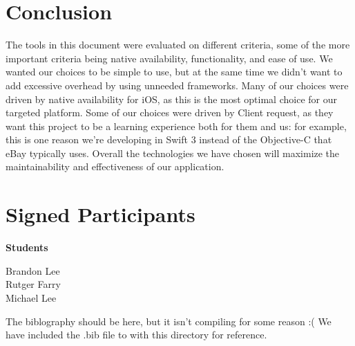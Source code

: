\documentclass[letterpaper,10pt,titlepage]{article}
\begin{document}
\section{Conclusion}
The tools in this document were evaluated on different criteria, some of the more important criteria being native availability, functionality, and ease of use. We wanted our choices to be simple to use, but at the same time we didn't want to add excessive overhead by using unneeded frameworks. Many of our choices were driven by native availability for iOS, as this is the most optimal choice for our targeted platform. Some of our choices were driven by Client request, as they want this project to be a learning experience both for them and us: for example, this is one reason we're developing in Swift 3 instead of the Objective-C that eBay typically uses. Overall the technologies we have chosen will maximize the maintainability and effectiveness of our application.\\

\newpage

\section{Signed Participants}

\textbf{Students}

Brandon Lee\\
Rutger Farry\\
Michael Lee\\

\newpage

The biblography should be here, but it isn't compiling for some reason :( We have included the .bib file to with this directory for reference.


\end{document}
